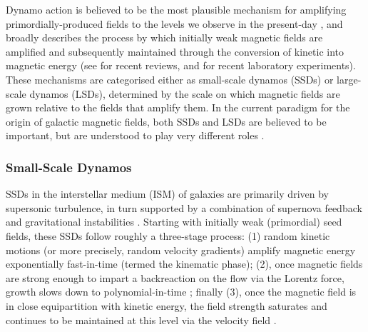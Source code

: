 \documentclass[12pt,twoside]{extreport}
\newcommand{\eg}{e.g.,\xspace} %
\begin{document}
Dynamo action is believed to be the most plausible mechanism for amplifying primordially-produced fields to the levels we observe in the present-day \citep[\eg][]{latif2013small, mtchedlidze2022evolution, mtchedlidze2023inflationary}, and broadly describes the process by which initially weak magnetic fields are amplified and subsequently maintained through the conversion of kinetic into magnetic energy (see \citealt{rincon2019dynamo, brandenburg2023galactic} for recent reviews, and \citealt{tzeferacos2018laboratory, bott2021time, bott2022insensitivity} for recent laboratory experiments). These mechanisms are categorised either as small-scale dynamos (SSDs) or large-scale dynamos (LSDs), determined by the scale on which magnetic fields are grown relative to the fields that amplify them. In the current paradigm for the origin of galactic magnetic fields, both SSDs and LSDs are believed to be important, but are understood to play very different roles \citep[see, \eg][for recent works]{bhat2016unified, pakmor2017magnetic, rieder2017dynamo2, rieder2017dynamo3, steinwandel2023towards, gent2023transition}.

\subsubsection{Small-Scale Dynamos}

SSDs in the interstellar medium (ISM) of galaxies are primarily driven by supersonic turbulence, in turn supported by a combination of supernova feedback and gravitational instabilities \citep{krumholz2016turbulence, bacchini2020evidence}. Starting with initially weak (primordial) seed fields, these SSDs follow roughly a three-stage process: (1) random kinetic motions (or more precisely, random velocity gradients) \citep[\eg][]{vainshtein1972origin, zel1984kinematic, archontis2003numerical} amplify magnetic energy exponentially fast-in-time (termed the kinematic phase); (2), once magnetic fields are strong enough to impart a backreaction on the flow via the Lorentz force, growth slows down to polynomial-in-time \citep[termed the nonlinear phase; \eg][see also \S\ref{sec:discussion:saturation} for a discussion]{schekochihin2004simulations, beresnyak2012universal, Schleicher2013_quadratic_growth, Xu2016_dynamo, seta2020seed}; finally (3), once the magnetic field is in close equipartition with kinetic energy, the field strength saturates and continues to be maintained at this level via the velocity field \citep[\eg][]{schekochihin2002spectra, cho2009growth, seta2021saturation, beattie2022growth}.
\end{document}
